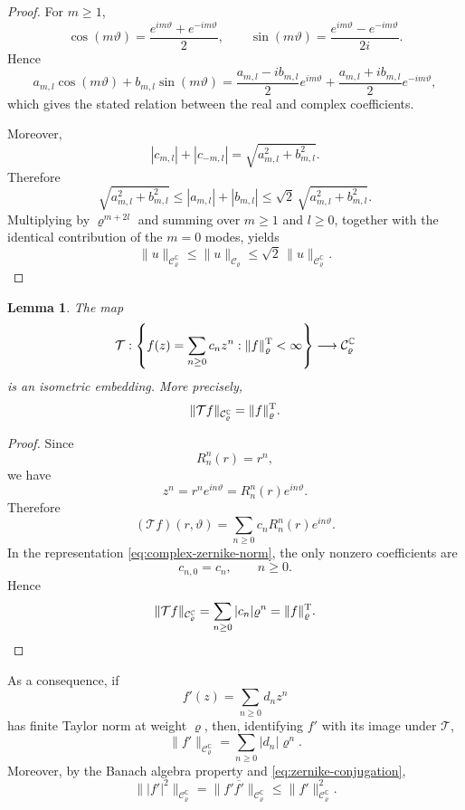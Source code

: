 \documentclass[11pt,a4paper]{amsart}
\newtheorem{lemma}[theorem]{Lemma}
\begin{document}
\begin{proof}
	For $m\ge1$,
	\[
	\cos(m\vartheta)
	=
	\frac{e^{im\vartheta}+e^{-im\vartheta}}{2},
	\qquad
	\sin(m\vartheta)
	=
	\frac{e^{im\vartheta}-e^{-im\vartheta}}{2i}.
	\]
	Hence
	\[
	a_{m,l}\cos(m\vartheta)
	+
	b_{m,l}\sin(m\vartheta)
	=
	\frac{a_{m,l}-ib_{m,l}}{2}e^{im\vartheta}
	+
	\frac{a_{m,l}+ib_{m,l}}{2}e^{-im\vartheta},
	\]
	which gives the stated relation between the real and complex
	coefficients.
	
	Moreover,
	\[
	|c_{m,l}|+|c_{-m,l}|
	=
	\sqrt{a_{m,l}^2+b_{m,l}^2}.
	\]
	Therefore
	\[
	\sqrt{a_{m,l}^2+b_{m,l}^2}
	\le
	|a_{m,l}|+|b_{m,l}|
	\le
	\sqrt2\,
	\sqrt{a_{m,l}^2+b_{m,l}^2}.
	\]
	Multiplying by $\varrho^{m+2l}$ and summing over $m\ge1$ and $l\ge0$,
	together with the identical contribution of the $m=0$ modes, yields
	\[
	\|u\|_{\mathcal C_\varrho^{\mathbb C}}
	\le
	\|u\|_{\mathcal C_\varrho}
	\le
	\sqrt2\,
	\|u\|_{\mathcal C_\varrho^{\mathbb C}}.
	\]
\end{proof}
\begin{lemma}\label{lem:taylor-zernike}
	The map
	\[
	\mathcal T:
	\left\{
	f(z)=\sum_{n\ge0}c_nz^n:
	\|f\|_\varrho^{\rm T}<\infty
	\right\}
	\longrightarrow
	\mathcal C_\varrho^{\mathbb C}
	\]
	is an isometric embedding. More precisely,
	\begin{equation}\label{eq:taylor-zernike-isometry}
		\|\mathcal T f\|_{\mathcal C_\varrho^{\mathbb C}}
		=
		\|f\|_\varrho^{\rm T}.
	\end{equation}
\end{lemma}

\begin{proof}
	Since
	\[
	R_n^n(r)=r^n,
	\]
	we have
	\[
	z^n
	=
	r^ne^{in\vartheta}
	=
	R_n^n(r)e^{in\vartheta}.
	\]
	Therefore
	\[
	(\mathcal T f)(r,\vartheta)
	=
	\sum_{n\ge0}
	c_nR_n^n(r)e^{in\vartheta}.
	\]
	In the representation
	\eqref{eq:complex-zernike-norm}, the only nonzero coefficients are
	\[
	c_{n,0}=c_n,
	\qquad n\ge0.
	\]
	Hence
	\[
	\|\mathcal T f\|_{\mathcal C_\varrho^{\mathbb C}}
	=
	\sum_{n\ge0}|c_n|\varrho^n
	=
	\|f\|_\varrho^{\rm T}.
	\]
\end{proof}

As a consequence, if
\[
f'(z)=\sum_{n\ge0}d_nz^n
\]
has finite Taylor norm at weight $\varrho$, then, identifying $f'$
with its image under $\mathcal T$,
\begin{equation}\label{eq:fprime-taylor-zernike}
	\|f'\|_{\mathcal C_\varrho^{\mathbb C}}
	=
	\sum_{n\ge0}|d_n|\varrho^n.
\end{equation}
Moreover, by the Banach algebra property and
\eqref{eq:zernike-conjugation},
\begin{equation}\label{eq:q-zernike-bound}
	\||f'|^2\|_{\mathcal C_\varrho^{\mathbb C}}
	=
	\|f'\overline{f'}\|_{\mathcal C_\varrho^{\mathbb C}}
	\le
	\|f'\|_{\mathcal C_\varrho^{\mathbb C}}^2.
\end{equation}
\end{document}
